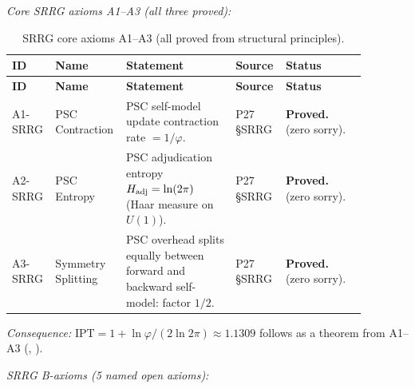 \noindent\textit{Core SRRG axioms A1--A3 (all three proved):}

\begingroup\footnotesize\renewcommand{\arraystretch}{1.2}
\begin{longtable}{@{}P{0.10\linewidth}P{0.14\linewidth}P{0.30\linewidth}P{0.12\linewidth}P{0.22\linewidth}@{}}
\caption{SRRG core axioms A1--A3 (all proved from structural principles).}
\label{tab:mi-srrg-core}\\
\toprule
\textbf{ID} & \textbf{Name} & \textbf{Statement} & \textbf{Source} & \textbf{Status} \\
\midrule
\endfirsthead
\midrule
\textbf{ID} & \textbf{Name} & \textbf{Statement} & \textbf{Source} & \textbf{Status} \\
\midrule
\endhead
\bottomrule
\endfoot
A1-SRRG & PSC Contraction & PSC self-model update contraction rate $= 1/\varphi$. &
  P27 \S SRRG &
  \textbf{Proved.}  (zero sorry). \\
A2-SRRG & PSC Entropy & PSC adjudication entropy $H_{\rm adj} = \ln(2\pi)$
  (Haar measure on $U(1)$). &
  P27 \S SRRG &
  \textbf{Proved.}  (zero sorry). \\
A3-SRRG & Symmetry Splitting & PSC overhead splits equally between forward and backward
  self-model: factor $1/2$. &
  P27 \S SRRG &
  \textbf{Proved.}  (zero sorry). \\
\end{longtable}
\endgroup

\noindent\textit{Consequence:} $\mathrm{IPT} = 1 + \ln\varphi/(2\ln 2\pi) \approx 1.1309$ follows as a
theorem from A1--A3 (, \CatAL).

\medskip\noindent\textit{SRRG B-axioms (5 named open axioms):}

